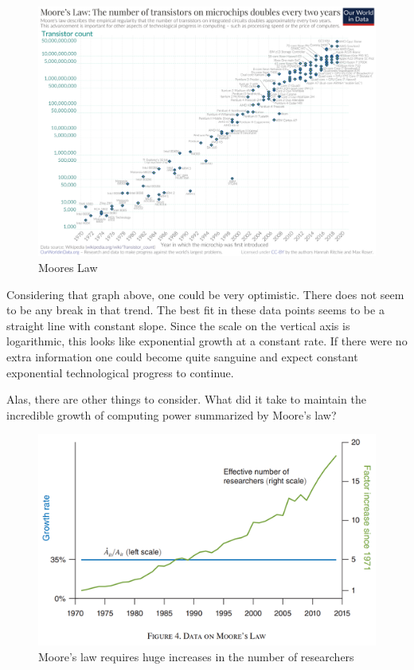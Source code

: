 \documentclass[
]{book}
\begin{document}
\begin{figure}

{\centering \includegraphics[width=1\linewidth]{img/ch1/moore15} 

}

\caption{Moores Law}\label{fig:fig115}
\end{figure}

Considering that graph above, one could be very optimistic. There does not seem to be any break in that trend. The best fit in these data points seems to be a straight line with constant slope. Since the scale on the vertical axis is logarithmic, this looks like exponential growth at a constant rate. If there were no extra information one could become quite sanguine and expect constant exponential technological progress to continue.

Alas, there are other things to consider. What did it take to maintain the incredible growth of computing power summarized by Moore's law?

\begin{figure}

{\centering \includegraphics[width=1\linewidth]{img/ch1/moore16} 

}

\caption{Moore’s law requires huge increases in the number of researchers}\label{fig:fig116}
\end{figure}
\end{document}
